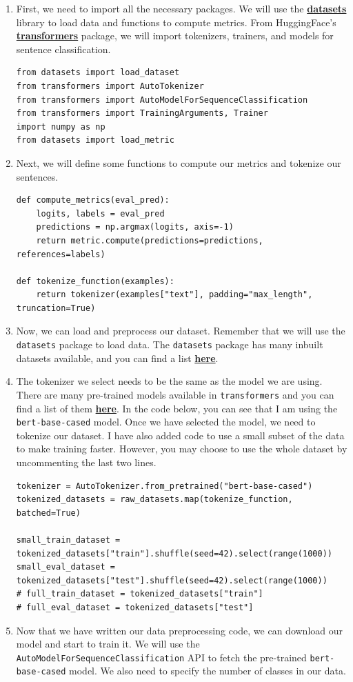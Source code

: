\begin{enumerate}
    \item First, we need to import all the necessary packages. We will use the \href{https://pypi.org/project/datasets/}{\textbf{datasets}} library to load data and functions to compute metrics. From HuggingFace's \href{https://pypi.org/project/transformers/}{\textbf{transformers}} package, we will import tokenizers, trainers, and models for sentence classification.
    \begin{lstlisting}
from datasets import load_dataset
from transformers import AutoTokenizer
from transformers import AutoModelForSequenceClassification
from transformers import TrainingArguments, Trainer
import numpy as np
from datasets import load_metric
    \end{lstlisting}
    \item Next, we will define some functions to compute our metrics and tokenize our sentences.
    \begin{lstlisting}
def compute_metrics(eval_pred):
    logits, labels = eval_pred
    predictions = np.argmax(logits, axis=-1)
    return metric.compute(predictions=predictions, references=labels)

def tokenize_function(examples):
    return tokenizer(examples["text"], padding="max_length", truncation=True)
    \end{lstlisting}
    \item Now, we can load and preprocess our dataset. Remember that we will use the \lstinline|datasets| package to load data. The \lstinline|datasets| package has many inbuilt datasets available, and you can find a list \href{https://huggingface.co/datasets}{\textbf{here}}.
    \item The tokenizer we select needs to be the same as the model we are using. There are many pre-trained models available in \lstinline|transformers| and you can find a list of them \href{https://huggingface.co/transformers/pretrained_models.html}{\textbf{here}}. In the code below, you can see that I am using the \lstinline|bert-base-cased| model. Once we have selected the model, we need to tokenize our dataset. I have also added code to use a small subset of the data to make training faster. However, you may choose to use the whole dataset by uncommenting the last two lines.
    \begin{lstlisting}
tokenizer = AutoTokenizer.from_pretrained("bert-base-cased")
tokenized_datasets = raw_datasets.map(tokenize_function, batched=True)

small_train_dataset = tokenized_datasets["train"].shuffle(seed=42).select(range(1000))
small_eval_dataset = tokenized_datasets["test"].shuffle(seed=42).select(range(1000))
# full_train_dataset = tokenized_datasets["train"]
# full_eval_dataset = tokenized_datasets["test"]
    \end{lstlisting}
    \item Now that we have written our data preprocessing code, we can download our model and start to train it. We will use the \lstinline|AutoModelForSequenceClassification| API to fetch the pre-trained \lstinline{bert-base-cased} model. We also need to specify the number of classes in our data.
\end{enumerate}
